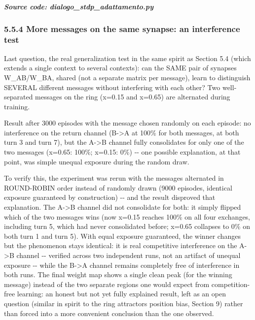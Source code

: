 \documentclass[
  english,
]{article}
\begin{document}
\textit{\textbf{Source code: dialogo\_\allowbreak{}stdp\_\allowbreak{}adattamento.py}}


\subsubsection{5.5.4 More messages on the same synapse: an interference test}\label{more-messages-on-the-same-synapse-an-interference-test}

Last question, the real generalization test in the same spirit as Section 5.4 (which extends a single context to several contexts): can the SAME pair of synapses W\_\allowbreak{}AB/W\_\allowbreak{}BA, shared (not a separate matrix per message), learn to distinguish SEVERAL different messages without interfering with each other? Two well-separated messages on the ring (x=0.15 and x=0.65) are alternated during training.

Result after 3000 episodes with the message chosen randomly on each episode: no interference on the return channel (B-\textgreater A at 100\% for both messages, at both turn 3 and turn 7), but the A-\textgreater B channel fully consolidates for only one of the two messages (x=0.65: 100\%; x=0.15: 0\%) -\/- one possible explanation, at that point, was simple unequal exposure during the random draw.

To verify this, the experiment was rerun with the messages alternated in ROUND-ROBIN order instead of randomly drawn (9000 episodes, identical exposure guaranteed by construction) -\/- and the result disproved that explanation. The A-\textgreater B channel did not consolidate for both: it simply flipped which of the two messages wins (now x=0.15 reaches 100\% on all four exchanges, including turn 5, which had never consolidated before; x=0.65 collapses to 0\% on both turn 1 and turn 5). With equal exposure guaranteed, the winner changes but the phenomenon stays identical: it is real competitive interference on the A-\textgreater B channel -\/- verified across two independent runs, not an artifact of unequal exposure -\/- while the B-\textgreater A channel remains completely free of interference in both runs. The final weight map shows a single clean peak (for the winning message) instead of the two separate regions one would expect from competition-free learning: an honest but not yet fully explained result, left as an open question (similar in spirit to the ring attractor\textquotesingle s position bias, Section 9) rather than forced into a more convenient conclusion than the one observed.
\end{document}
